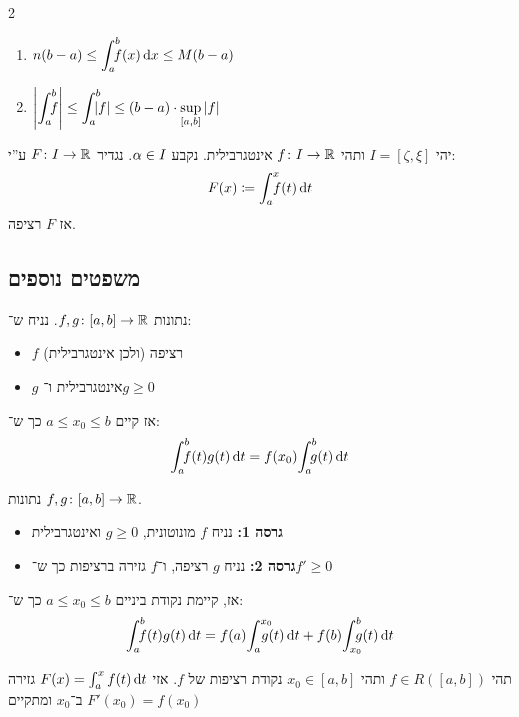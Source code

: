 \documentclass[]{../../../tex/classes/styledArticle}
\begin{document}
\begin{multicols}{2}
\begin{Theorem}
\begin{enumerate}
					\item \hfil $\displaystyle n(b - a) \le \int^{b}_a\!\!\!\!\!\! \ f(x) \,\mathrm{d}x \le M(b - a)$
					\item \hfil $\displaystyle \sof{\int^b_a\dequad \ f} \le \int^b_a\dequad \ \sof f \le (b -a) \cdot \sup_{[a, b]} \sof f$
				\end{enumerate}
			\end{Theorem}
			\begin{Theorem}
				יהי $I = [\zeta, \xi]$ ותהי $f \colon I \to \mathbb{R}$ אינטגרבילית. נקבע $\alpha \in I$. נגדיר $F \colon I \to \mathbb{R}$ ע''י:
				\[ F(x) \coloneqq \int^x_a \!\!\!\!\!\! \ f(t)\,\mathrm{d}t \]
				אז $F$ רציפה.
			\end{Theorem}
			
		\subsection{משפטים נוספים}
			\begin{Theorem}
				נתונות $f, g \colon [a, b] \to \mathbb{R}$. נניח ש־:
				\begin{itemize}
					\item $f$ רציפה (ולכן אינטגרבילית)
					\item $g$ אינטגרבילית ו־$g \ge 0$
				\end{itemize}
				אז קיים $a \le x_0 \le b$ כך ש־:
				\[ \int^b_a \dequad \ f(t)g(t) \dt = f(x_0)\!\int^{b}_a\dequad \ g(t) \dt \]
			\end{Theorem}
			\begin{Lemma}נתונות $f, g \colon [a, b] \to \mathbb{R}$.
				\begin{itemize}
					\item \textbf{גרסה 1: }נניח $f$ מונוטונית, $g \ge 0$ ואינטגרבילית
					\item \textbf{גרסה 2: }נניח $g$ רציפה, ו־$f$ גזירה ברציפות כך ש־$f' \ge 0$
				\end{itemize}
				אז, קיימת נקודת ביניים $a \le x_0 \le b$ כך ש־:
				\[ \int^b_a \dequad \ f(t)g(t) \dt = f(a)\! \int^{x_0}_a \dequad g(t) \dt + f(b) \!\int^{b}_{x_0}\dequad \ g(t) \dt \]
			\end{Lemma}
			\begin{Theorem}
				תהי $f \in R([a, b])$ ותהי $x_0 \in [a, b]$ נקודת רציפות של $f$. אזי $F(x) = \int^{x}_a f(t)\,\mathrm{d}t$ גזירה ב־$x_0$ ומתקיים $F'(x_0) = f(x_0)$

\end{Theorem}
\end{multicols}
\end{document}

